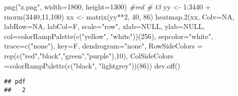 \documentclass[
]{article}
\newenvironment{Shaded}{\begin{snugshade}}{\end{snugshade}}
\newcommand{\AttributeTok}[1]{\textcolor[rgb]{0.77,0.63,0.00}{#1}}
\newcommand{\CommentTok}[1]{\textcolor[rgb]{0.56,0.35,0.01}{\textit{#1}}}
\newcommand{\ConstantTok}[1]{\textcolor[rgb]{0.00,0.00,0.00}{#1}}
\newcommand{\DecValTok}[1]{\textcolor[rgb]{0.00,0.00,0.81}{#1}}
\newcommand{\FunctionTok}[1]{\textcolor[rgb]{0.00,0.00,0.00}{#1}}
\newcommand{\NormalTok}[1]{#1}
\newcommand{\OtherTok}[1]{\textcolor[rgb]{0.56,0.35,0.01}{#1}}
\newcommand{\SpecialCharTok}[1]{\textcolor[rgb]{0.00,0.00,0.00}{#1}}
\newcommand{\StringTok}[1]{\textcolor[rgb]{0.31,0.60,0.02}{#1}}
\begin{document}
\begin{Shaded}
\begin{Highlighting}[]
\FunctionTok{png}\NormalTok{(}\StringTok{"z.png"}\NormalTok{, }\AttributeTok{width=}\DecValTok{1800}\NormalTok{, }\AttributeTok{height=}\DecValTok{1300}\NormalTok{) }\CommentTok{\#red \# t3 }
\NormalTok{yy }\OtherTok{\textless{}{-}} \DecValTok{1}\SpecialCharTok{:}\DecValTok{3440} \SpecialCharTok{+} \FunctionTok{rnorm}\NormalTok{(}\DecValTok{3440}\NormalTok{,}\DecValTok{11}\NormalTok{,}\DecValTok{100}\NormalTok{)}
\NormalTok{xx }\OtherTok{\textless{}{-}} \FunctionTok{matrix}\NormalTok{(yy}\SpecialCharTok{**}\DecValTok{2}\NormalTok{, }\DecValTok{40}\NormalTok{, }\DecValTok{86}\NormalTok{)}
\FunctionTok{heatmap.2}\NormalTok{(xx, }\AttributeTok{Colv=}\ConstantTok{NA}\NormalTok{, }\AttributeTok{labRow=}\ConstantTok{NA}\NormalTok{, }\AttributeTok{labCol=}\NormalTok{F, }\AttributeTok{scale=}\StringTok{"row"}\NormalTok{, }\AttributeTok{xlab=}\ConstantTok{NULL}\NormalTok{,}
          \AttributeTok{ylab=}\ConstantTok{NULL}\NormalTok{, }\AttributeTok{col=}\FunctionTok{colorRampPalette}\NormalTok{(}\FunctionTok{c}\NormalTok{(}\StringTok{"yellow"}\NormalTok{, }\StringTok{"white"}\NormalTok{))(}\DecValTok{256}\NormalTok{),  }
        \AttributeTok{sepcolor=}\StringTok{"white"}\NormalTok{, }\AttributeTok{trace=}\FunctionTok{c}\NormalTok{(}\StringTok{"none"}\NormalTok{), }\AttributeTok{key=}\NormalTok{F, }\AttributeTok{dendrogram=}\StringTok{"none"}\NormalTok{,}
        \AttributeTok{RowSideColors =} \FunctionTok{rep}\NormalTok{(}\FunctionTok{c}\NormalTok{(}\StringTok{"red"}\NormalTok{,}\StringTok{"black"}\NormalTok{,}\StringTok{"green"}\NormalTok{,}\StringTok{"purple"}\NormalTok{),}\DecValTok{10}\NormalTok{),}
        \AttributeTok{ColSideColors =}\FunctionTok{colorRampPalette}\NormalTok{(}\FunctionTok{c}\NormalTok{(}\StringTok{"black"}\NormalTok{, }\StringTok{"lightgrey"}\NormalTok{))(}\DecValTok{86}\NormalTok{))}
\FunctionTok{dev.off}\NormalTok{()}
\end{Highlighting}
\end{Shaded}

\begin{verbatim}
## pdf 
##   2
\end{verbatim}
\end{document}
